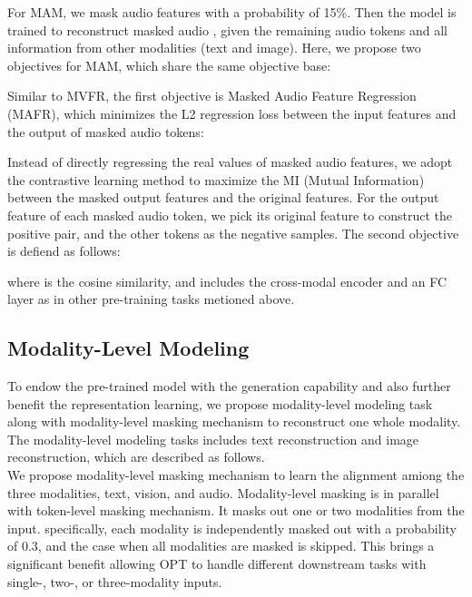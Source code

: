 \documentclass[10pt,twocolumn,letterpaper]{article}
\begin{document}
 For MAM, we mask audio features with a probability of 15\%. Then the model is trained to reconstruct masked audio , given the remaining audio tokens  and all information from other modalities (\ie text and image). Here, we propose two objectives for MAM, which share the same objective base:
 

Similar to MVFR, the first objective is Masked Audio Feature Regression (MAFR), which minimizes the L2 regression loss between the input features and the output of masked audio tokens: 


Instead of directly regressing the real values of masked audio features, we adopt the contrastive learning method to maximize the MI (Mutual Information) between the masked output features and the original features. For the output feature of each masked audio token, we pick its original feature to construct the positive pair, and the other tokens as the negative samples. The second objective is defiend as follows: 
\begin{small}

\end{small}
where  is the cosine similarity, and  includes the cross-modal encoder and an FC layer as in other pre-training tasks metioned above.

\subsection{Modality-Level Modeling}
To endow the pre-trained model with the generation capability and also further benefit the representation learning, we propose modality-level modeling task along with modality-level masking mechanism to reconstruct one whole modality. The modality-level modeling tasks includes text reconstruction and image reconstruction, which are described as follows.  \\

 We propose modality-level masking mechanism to learn the alignment amiong the three modalities, \ie text, vision, and audio. Modality-level masking is in parallel with token-level masking mechanism. It masks out one or two modalities from the input. specifically, each modality is independently masked out with a probability of 0.3, and the case when all modalities are masked is skipped. This brings a significant benefit   allowing OPT to handle different downstream tasks with single-, two-, or three-modality inputs. \\
\end{document}
